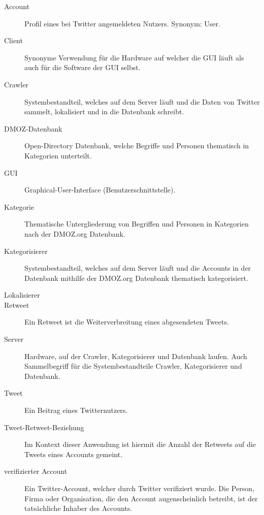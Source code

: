 
\begin{description}
	\item[Account] Profil eines bei Twitter angemeldeten Nutzers. Synonym: User.
	\item[Client] Synonyme Verwendung für die Hardware auf welcher die GUI läuft als auch für die Software der GUI selbst.
	\item[Crawler] Systembestandteil, welches auf dem Server läuft und die Daten von Twitter sammelt, lokalisiert und in die Datenbank schreibt.
	\item [DMOZ-Datenbank] Open-Directory Datenbank, welche Begriffe und Personen thematisch in Kategorien unterteilt.
	\item[GUI] Graphical-User-Interface (Benutzerschnittstelle).
	\item[Kategorie] Thematische Untergliederung von Begriffen und Personen in Kategorien nach der DMOZ.org Datenbank.
	\item[Kategorisierer] Systembestandteil, welches auf dem Server läuft und die Accounts in der Datenbank mithilfe der DMOZ.org Datenbank thematisch kategorisiert.
	\item[Lokalisierer]
	\item[Retweet] Ein Retweet ist die Weiterverbreitung eines abgesendeten Tweets.
	\item[Server] Hardware, auf der Crawler, Kategorisierer und  Datenbank laufen. Auch Sammelbegriff für die Systembestandteile Crawler, Kategorisierer und Datenbank.
	\item[Tweet] Ein Beitrag eines Twitternutzers.
	\item[Tweet-Retweet-Beziehung] Im Kontext dieser Anwendung ist hiermit die Anzahl der Retweets auf die Tweets eines Accounts gemeint.
	\item[verifizierter Account] Ein Twitter-Account, welcher durch Twitter verifiziert wurde. Die Person, Firma oder Organisation, die den Account augenscheinlich betreibt, ist der tatsächliche Inhaber des Accounts.
\end{description}
